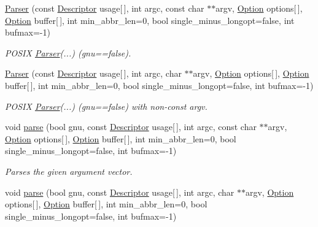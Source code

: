 \begin{DoxyCompactItemize}
\hyperlink{classoption_1_1Parser_ae4100da4b662937ead22484e6cfc7cec}{Parser} (const \hyperlink{structoption_1_1Descriptor}{Descriptor} usage\mbox{[}$\,$\mbox{]}, int argc, const char $\ast$$\ast$argv, \hyperlink{classoption_1_1Option}{Option} options\mbox{[}$\,$\mbox{]}, \hyperlink{classoption_1_1Option}{Option} buffer\mbox{[}$\,$\mbox{]}, int min\+\_\+abbr\+\_\+len=0, bool single\+\_\+minus\+\_\+longopt=false, int bufmax=-\/1)
\begin{DoxyCompactList}\small\item\em P\+O\+S\+IX \hyperlink{classoption_1_1Parser}{Parser}(...) (gnu==false). \end{DoxyCompactList}\item 
\mbox{\label{classoption_1_1Parser_a23ee244634a38d05f6c4cb1e3692a8a9}} 
\hyperlink{classoption_1_1Parser_a23ee244634a38d05f6c4cb1e3692a8a9}{Parser} (const \hyperlink{structoption_1_1Descriptor}{Descriptor} usage\mbox{[}$\,$\mbox{]}, int argc, char $\ast$$\ast$argv, \hyperlink{classoption_1_1Option}{Option} options\mbox{[}$\,$\mbox{]}, \hyperlink{classoption_1_1Option}{Option} buffer\mbox{[}$\,$\mbox{]}, int min\+\_\+abbr\+\_\+len=0, bool single\+\_\+minus\+\_\+longopt=false, int bufmax=-\/1)
\begin{DoxyCompactList}\small\item\em P\+O\+S\+IX \hyperlink{classoption_1_1Parser}{Parser}(...) (gnu==false) with non-\/const argv. \end{DoxyCompactList}\item 
void \hyperlink{classoption_1_1Parser_a6e0b5778d1cfbd6cd51240e74d01e138}{parse} (bool gnu, const \hyperlink{structoption_1_1Descriptor}{Descriptor} usage\mbox{[}$\,$\mbox{]}, int argc, const char $\ast$$\ast$argv, \hyperlink{classoption_1_1Option}{Option} options\mbox{[}$\,$\mbox{]}, \hyperlink{classoption_1_1Option}{Option} buffer\mbox{[}$\,$\mbox{]}, int min\+\_\+abbr\+\_\+len=0, bool single\+\_\+minus\+\_\+longopt=false, int bufmax=-\/1)
\begin{DoxyCompactList}\small\item\em Parses the given argument vector. \end{DoxyCompactList}\item 
\mbox{\label{classoption_1_1Parser_ab26280e3b2ebc2f2fc4ed8b3b1e2a39c}} 
void \hyperlink{classoption_1_1Parser_ab26280e3b2ebc2f2fc4ed8b3b1e2a39c}{parse} (bool gnu, const \hyperlink{structoption_1_1Descriptor}{Descriptor} usage\mbox{[}$\,$\mbox{]}, int argc, char $\ast$$\ast$argv, \hyperlink{classoption_1_1Option}{Option} options\mbox{[}$\,$\mbox{]}, \hyperlink{classoption_1_1Option}{Option} buffer\mbox{[}$\,$\mbox{]}, int min\+\_\+abbr\+\_\+len=0, bool single\+\_\+minus\+\_\+longopt=false, int bufmax=-\/1)

\end{DoxyCompactItemize}
